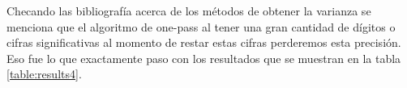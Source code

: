 Checando las bibliografía acerca de los métodos de obtener la varianza se menciona que el algoritmo de one-pass al tener una gran cantidad de dígitos o cifras significativas al momento de restar estas cifras perderemos esta precisión\cite{cook_2021}. Eso fue lo que exactamente paso con los resultados que se muestran en la tabla \ref{table:results4}.